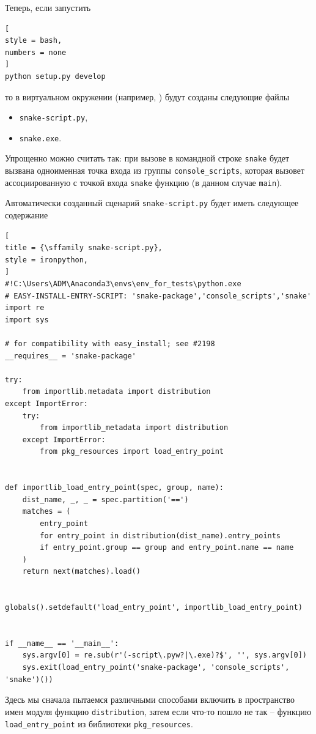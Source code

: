 \documentclass[%
	11pt,
	a4paper,
	utf8,
		]{article}
\begin{document}
Теперь, если запустить 
\begin{lstlisting}[
style = bash,
numbers = none	
]
python setup.py develop
\end{lstlisting}
то в виртуальном окружении (например, ) будут созданы следующие файлы
\begin{itemize}
	\item \texttt{snake-script.py},
	
	\item \texttt{snake.exe}.
\end{itemize}

Упрощенно можно считать так: при вызове в командной строке \texttt{snake} будет вызвана одноименная точка входа из группы \texttt{console\_scripts}, которая вызовет ассоциированную с точкой входа \texttt{snake} функцию (в данном случае \texttt{main}).

Автоматически созданный сценарий \texttt{snake-script.py} будет иметь следующее содержание
\begin{lstlisting}[
title = {\sffamily snake-script.py},
style = ironpython,
]
#!C:\Users\ADM\Anaconda3\envs\env_for_tests\python.exe
# EASY-INSTALL-ENTRY-SCRIPT: 'snake-package','console_scripts','snake'
import re
import sys

# for compatibility with easy_install; see #2198
__requires__ = 'snake-package'

try:
    from importlib.metadata import distribution
except ImportError:
    try:
        from importlib_metadata import distribution
    except ImportError:
        from pkg_resources import load_entry_point


def importlib_load_entry_point(spec, group, name):
    dist_name, _, _ = spec.partition('==')
    matches = (
        entry_point
        for entry_point in distribution(dist_name).entry_points
        if entry_point.group == group and entry_point.name == name
    )
    return next(matches).load()


globals().setdefault('load_entry_point', importlib_load_entry_point)


if __name__ == '__main__':
    sys.argv[0] = re.sub(r'(-script\.pyw?|\.exe)?$', '', sys.argv[0])
    sys.exit(load_entry_point('snake-package', 'console_scripts', 'snake')())
\end{lstlisting}

Здесь мы сначала пытаемся различными способами включить в пространство имен модуля функцию \texttt{distribution}, затем если что-то пошло не так -- функцию \texttt{load\_entry\_point} из библиотеки \texttt{pkg\_resources}.
\end{document}

